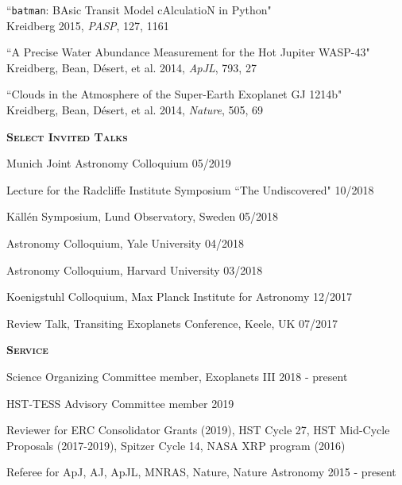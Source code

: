 \documentclass[12pt,letterpaper]{article}
\begin{document}
\begin{compactenum}
\item ``\texttt{batman}: BAsic Transit Model cAlculatioN in Python"\\
Kreidberg 2015, \textit{PASP}, 127, 1161 

\item ``A Precise Water Abundance Measurement for the Hot Jupiter WASP-43"\\
Kreidberg, Bean, D\'esert, et al. 2014, \textit{ApJL}, 793, 27


\item ``Clouds in the Atmosphere of the Super-Earth Exoplanet GJ 1214b"\\
Kreidberg, Bean, D\'esert, et al. 2014, \textit{Nature}, 505, 69

\end{compactenum}



\vspace{5mm}
\textbf{\textsc{Select Invited Talks}} 
\begin{compactitem}[]
\item {Munich Joint Astronomy Colloquium \hfill 05/2019}
\item {Lecture for the Radcliffe Institute Symposium ``The Undiscovered" \hfill 10/2018}
\item {K\"{a}ll\'{e}n Symposium, Lund Observatory, Sweden \hfill 05/2018}
\item {Astronomy Colloquium, Yale University \hfill 04/2018}
\item{Astronomy Colloquium, Harvard University \hfill 03/2018}
\item {Koenigstuhl Colloquium, Max Planck Institute for Astronomy \hfill 12/2017}
\item {Review Talk, Transiting Exoplanets Conference, Keele, UK \hfill 07/2017}
\end{compactitem}



\vspace{3mm}
\textbf{\textsc{Service}} 
\begin{compactitem}[]
\item {Science Organizing Committee member, Exoplanets III \hfill 2018 - present}
\item {HST-TESS Advisory Committee member \hfill 2019}

\item {Reviewer for ERC Consolidator Grants (2019), HST Cycle 27,  HST Mid-Cycle Proposals (2017-2019), Spitzer Cycle 14, NASA XRP program (2016)}
\item Referee for ApJ, AJ, ApJL, MNRAS, Nature, Nature Astronomy \hfill 2015 - present
\end{compactitem}
\end{document}
